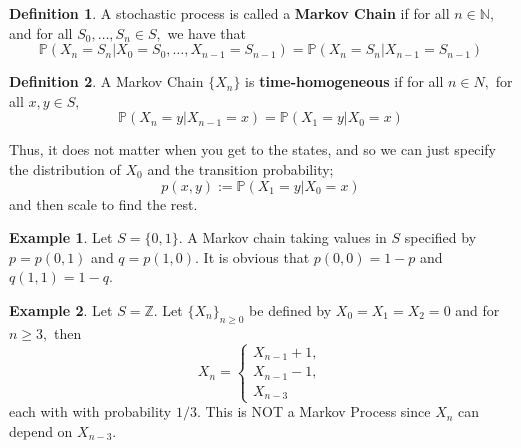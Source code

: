 \documentclass[10pt, oneside]{article}
\newcommand{\bbZ}{\mathbb{Z}}
\newcommand{\bbP}{\mathbb{P}}
\newcommand{\bbN}{\mathbb{N}}
\theoremstyle{definition}
\newtheorem{exmp}{Example}[section]
\newtheorem{defn}{Definition}
\begin{document}
\begin{defn}
    A stochastic process is called a \textbf{Markov Chain} if for all $n \in \bbN,$ and for all $S_0, \dots, S_n \in S,$ we have that 
    \[\bbP(X_n = S_n |  X_0= S_0, \dots, X_{n-1}= S_{n-1}) = \bbP(X_n = S_n | X_{n-1} =S_{n-1})\]
\end{defn}
\begin{defn}
    A Markov Chain $\{X_n\}$ is \textbf{time-homogeneous} if for all $n\in N,$ for all $x,y \in S,$ 
    \[\bbP(X_n = y | X_{n-1} = x) = \bbP(X_1 = y | X_0 = x)\]
\end{defn}
Thus, it does not matter when you get to the states, and so we can just specify the distribution of $X_0$ and the transition probability;
\[p(x,y) := \bbP(X_1 = y | X_0 = x)\]
and then scale to find the rest.
\begin{exmp}
    Let $S = \{0,1\}.$ A Markov chain taking values in $S$ specified by $p = p(0,1)$ and $q = p(1,0).$ It is obvious that $p(0,0) = 1-p$ and $q(1,1) = 1-q.$
\end{exmp}
\begin{exmp}
    Let $S = \bbZ.$ Let $\{X_n\}_{n\geq 0}$ be defined by $X_0 = X_1 = X_2 =0$ and for $n\geq 3,$ then 
    \[X_n = \begin{cases}
        X_{n-1} + 1,\\
        X_{n-1} - 1,\\
        X_{n-3}
    \end{cases}\]
    each with with probability $1/3.$ This is NOT a Markov Process since $X_n$ can depend on $X_{n-3}.$
\end{exmp}
\end{document}
